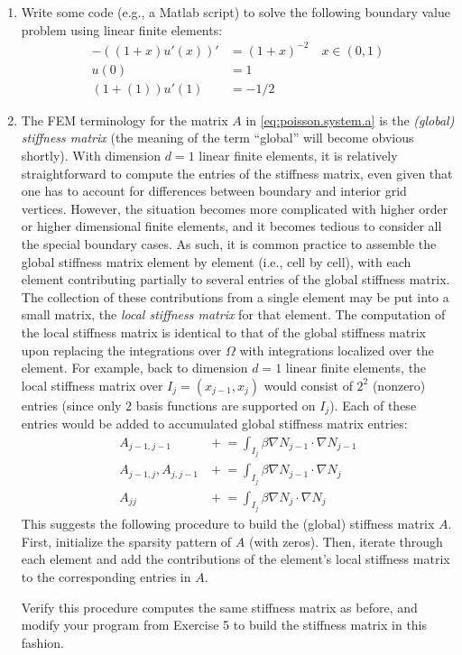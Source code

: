 \begin{enumerate}
\item Write some code (e.g., a Matlab script) to solve the following boundary value problem using linear finite elements:
\begin{align*}
-\left( \left( 1 + x \right) u'(x) \right)' & = \left( 1 + x \right)^{-2} \quad x \in (0, 1) \\
u(0) & = 1 \\
\left( 1 + (1) \right) u'(1) & = -1/2
\end{align*}

\item The FEM terminology for the matrix $A$ in \eqref{eq:poisson.system.a} is the \emph{(global) stiffness matrix} (the meaning of the term ``global'' will become obvious shortly). With dimension $d = 1$ linear finite elements, it is relatively straightforward to compute the entries of the stiffness matrix, even given that one has to account for differences between boundary and interior grid vertices. However, the situation becomes more complicated with higher order or higher dimensional finite elements, and it becomes tedious to consider all the special boundary cases. As such, it is common practice to assemble the global stiffness matrix element by element (i.e., cell by cell), with each element contributing partially to several entries of the global stiffness matrix. The collection of these contributions from a single element may be put into a small matrix, the \emph{local stiffness matrix} for that element. The computation of the local stiffness matrix is identical to that of the global stiffness matrix upon replacing the integrations over $\Omega$ with integrations localized over the element. For example, back to dimension $d = 1$ linear finite elements, the local stiffness matrix over $I_j = \left( x_{j-1}, x_j \right)$ would consist of $2^2$ (nonzero) entries (since only $2$ basis functions are supported on $I_j$). Each of these entries would be added to accumulated global stiffness matrix entries:
\begin{align*}
A_{j-1,j-1}          & {} + {} \!\!\!= \int_{I_j} \beta \nabla N_{j-1} \cdot \nabla N_{j-1} \\
A_{j-1,j}, A_{j,j-1} & {} + {} \!\!\!= \int_{I_j} \beta \nabla N_{j-1} \cdot \nabla N_j \\
A_{jj}               & {} + {} \!\!\!= \int_{I_j} \beta \nabla N_j \cdot \nabla N_j
\end{align*}
This suggests the following procedure to build the (global) stiffness matrix $A$. First, initialize the sparsity pattern of $A$ (with zeros). Then, iterate through each element and add the contributions of the element's local stiffness matrix to the corresponding entries in $A$.

Verify this procedure computes the same stiffness matrix as before, and modify your program from Exercise 5 to build the stiffness matrix in this fashion.

\end{enumerate}

